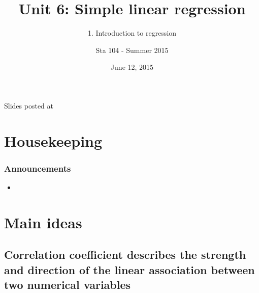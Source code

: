 \documentclass[11pt,containsverbatim,handout,xcolor=xelatex,dvipsnames,table]{beamer}
\title{Unit 6: Simple linear regression}
\subtitle{1. Introduction to regression}
\author{Sta 104 - Summer 2015}
\date{June 12, 2015}
\institute{Duke University, Department of Statistical Science}
\begin{document}



\begin{frame}[plain]

\titlepage
\vfill
{\scriptsize {} \hfill Slides posted at  \webLink{\CourseSite}{\CourseSite}}
\addtocounter{framenumber}{-1} 

\end{frame}


\section{Housekeeping}


\begin{frame}
\frametitle{Announcements}

\begin{itemize}

\item 

\end{itemize}

\end{frame}


\section{Main ideas}


\subsection{Correlation coefficient describes the strength and direction of the linear association between two numerical variables}
\label{mi1}

\end{document}
